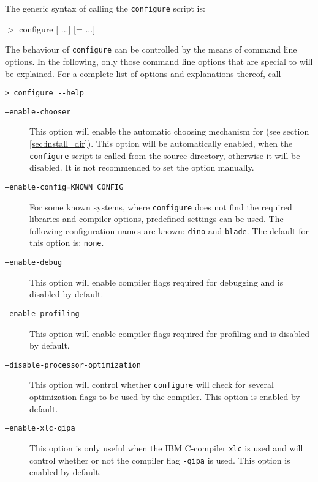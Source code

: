 The generic syntax of calling the \texttt{configure} script is:
\begin{syntax}
 $>$ configure [ ...] [= ...]
\end{syntax}

The behaviour of \texttt{configure} can be controlled by the means of
command line options. In the following, only those command line
options that are special to \es{} will be explained.  For a complete
list of options and explanations thereof, call
\begin{verbatim}
> configure --help
\end{verbatim}

\begin{description}
\item [\texttt{--enable-chooser}] This option will enable the
  automatic choosing mechanism for \es{} (see section
  \vref{sec:install_dir}).  This option will be automatically enabled,
  when the \texttt{configure} script is called from the source
  directory, otherwise it will be disabled. It is not recommended to
  set the option manually.
\item[\texttt{--enable-config=KNOWN\_CONFIG}] For some known systems,
  where \texttt{configure} does not find the required libraries and
  compiler options, predefined settings can be used. The following
  configuration names are known: \texttt{dino} and \texttt{blade}. The
  default for this option is: \texttt{none}.
\item[\texttt{--enable-debug}] This option will enable compiler flags
  required for debugging \es{} and is disabled by default.
\item[\texttt{--enable-profiling}] This option will enable compiler
  flags required for profiling \es{} and is disabled by default.
\item[\texttt{--disable-processor-optimization}] This option will
  control whether \texttt{configure} will check for several
  optimization flags to be used by the compiler. This option is
  enabled by default.
\item[\texttt{--enable-xlc-qipa}] This option is only useful when the
  IBM C-compiler \texttt{xlc} is used and will control whether or not
  the compiler flag \texttt{-qipa} is used. This option is enabled by
  default.


\end{description}

